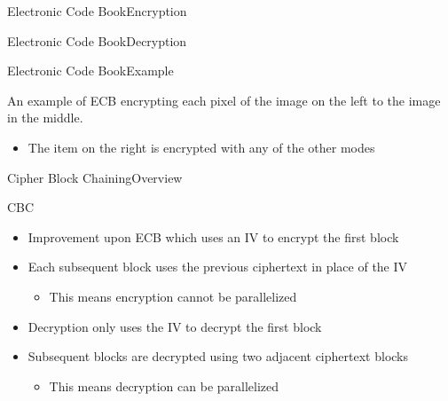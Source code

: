 \documentclass[12pt]{beamer}
\begin{document}
\begin{frame}{Electronic Code Book}{Encryption}
\begin{center}
\end{center}
\end{frame}

\begin{frame}{Electronic Code Book}{Decryption}
\begin{center}
\end{center}
\end{frame}

\begin{frame}{Electronic Code Book}{Example}
\begin{center}
\end{center}
\begin{block}{}
An example of ECB encrypting each pixel of the image on the left to the image in the middle. 
\begin{itemize}
	\item The item on the right is encrypted with any of the other modes
\end{itemize}
\end{block}

\end{frame}

\begin{frame}{Cipher Block Chaining}{Overview}
\begin{block}{CBC}
\begin{itemize}
	\item Improvement upon ECB which uses an IV to encrypt the first block
	\item Each subsequent block uses the previous ciphertext in place of the IV
	\begin{itemize}
		\item This means encryption cannot be parallelized
	\end{itemize}
	\item Decryption only uses the IV to decrypt the first block
	\item Subsequent blocks are decrypted using two adjacent ciphertext blocks
	\begin{itemize}
		\item This means decryption can be parallelized
	\end{itemize}
\end{itemize}
\end{block}
\end{frame}
\end{document}
